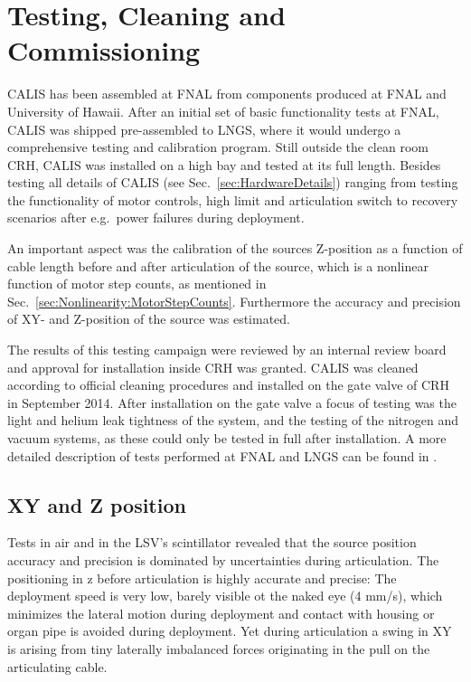 \section{Testing, Cleaning and Commissioning} \label{sec:Testing}\label{sec:Commissioning}
CALIS has been assembled at FNAL from components produced at FNAL and University of Hawaii. After an initial set of basic functionality tests at FNAL, CALIS was shipped pre-assembled to LNGS, where it would undergo a comprehensive testing and calibration program. Still outside the clean room CRH, CALIS was installed on a high bay and tested at its full length. Besides testing all details of CALIS (see Sec.~\ref{sec:HardwareDetails}) ranging from testing the functionality of motor controls, high limit and articulation switch to recovery scenarios after e.g.~power failures during deployment.

An important aspect was the calibration of the sources Z-position as a function of cable length before and after articulation of the source, which is a nonlinear function of motor step counts, as mentioned in Sec.~\ref{sec:Nonlinearity:MotorStepCounts}. Furthermore the accuracy and precision of XY- and Z-position of the source was estimated.

The results of this testing campaign were reviewed by an internal review board and approval for installation inside CRH was granted. CALIS was cleaned according to official cleaning procedures and installed on the gate valve of CRH in September 2014.
After installation on the gate valve a focus of testing was the light and helium leak tightness of the system, and the testing of the nitrogen and vacuum systems, as these could only be tested in full after installation. A more detailed description of tests performed at FNAL and LNGS can be found in \cite{thesis:Hackett, thesis:Edkins}.

\subsection*{XY and Z position}
Tests in air and in the LSV's scintillator revealed that the source position accuracy and precision is dominated by uncertainties during articulation. The positioning in z before articulation is highly accurate and precise: The deployment speed is very low, barely visible ot the naked eye (4 mm/s), which minimizes the lateral motion during deployment and contact with housing or organ pipe is avoided during deployment. Yet during articulation a swing in XY is arising from tiny laterally imbalanced forces originating in the pull on the articulating cable. 

